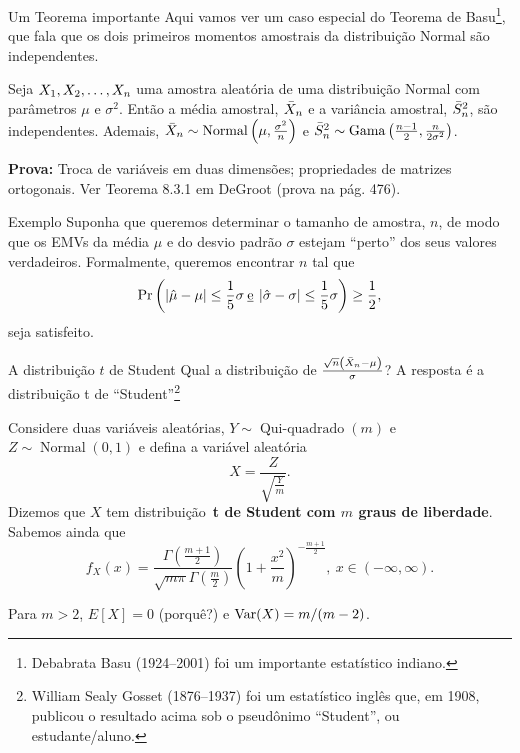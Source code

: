 \begin{frame}{Um Teorema importante}
 Aqui vamos ver um caso especial do Teorema de Basu\footnote{Debabrata Basu (1924--2001) foi um importante estatístico indiano.}, que fala que os dois primeiros momentos amostrais da distribuição Normal são independentes.
 \begin{theo}
 \label{thm:independence_sample_mean_variance_normal}
  Seja $X_1, X_2, \ldots, X_n$ uma amostra aleatória de uma distribuição Normal com parâmetros $\mu$ e $\sigma^2$.
  Então a média amostral, $\bar{X}_n$ e a variância amostral, $\bar{S}^2_n$, são independentes.
  Ademais, $\bar{X}_n \sim \operatorname{Normal}\left(\mu, \frac{\sigma^2}{n}\right)$ e $\bar{S}^2_n \sim \operatorname{Gama}\left(\frac{n-1}{2},  \frac{n}{2\sigma^2}\right)$.
 \end{theo}
\textbf{Prova:} Troca de variáveis em duas dimensões; propriedades de matrizes ortogonais.
Ver Teorema 8.3.1 em DeGroot (prova na pág. 476).
\end{frame}

\begin{frame}{Exemplo}
 Suponha que queremos determinar o tamanho de amostra, $n$, de modo que os EMVs da média $\mu$ e do desvio padrão $\sigma$ estejam ``perto'' dos seus valores verdadeiros.
 Formalmente, queremos encontrar $n$ tal que
 \[ \operatorname{Pr}\left( \left|\hat{\mu} - \mu\right| \leq \frac{1}{5}\sigma \: \text{\underline{e}} \: \left|\hat{\sigma}-\sigma\right| \leq  \frac{1}{5}\sigma \right) \geq \frac{1}{2} ,\]
 seja satisfeito.
\end{frame}

\begin{frame}{A distribuição $t$ de Student}
 Qual a distribuição de $\frac{\sqrt{n}\left(\bar{X}_n - \mu\right)}{\sigma}$?
 A resposta é a distribuição t de ``Student''\footnote{William Sealy Gosset (1876--1937) foi um estatístico inglês que, em 1908, publicou o resultado acima sob o pseudônimo ``Student'', ou estudante/aluno.}
 
 \begin{defn}[A distribuição t]
 \label{def:Student_t_distribution}
  Considere duas variáveis aleatórias, $Y \sim\operatorname{Qui-quadrado}(m)$ e $Z \sim\operatorname{Normal}(0, 1)$ e defina a variável aleatória
  \[ X = \frac{Z}{\sqrt{\frac{Y}{m}}}. \]
 Dizemos que $X$  tem distribuição~\textbf{t de Student com $m$ graus de liberdade}. 
 Sabemos ainda que
 \[f_X(x) = \frac{\Gamma(\frac{m + 1}{2})}{\sqrt{m\pi}\Gamma(\frac{m}{2})} \left(1 + \frac{x^2}{m}\right)^{-\frac{m+1}{2}},\: x \in (-\infty, \infty). \]
 \end{defn}
Para $m>2$, $E[X] = 0$ (porquê?) e $\operatorname{Var}(X) = m/(m-2)$.
\end{frame}

